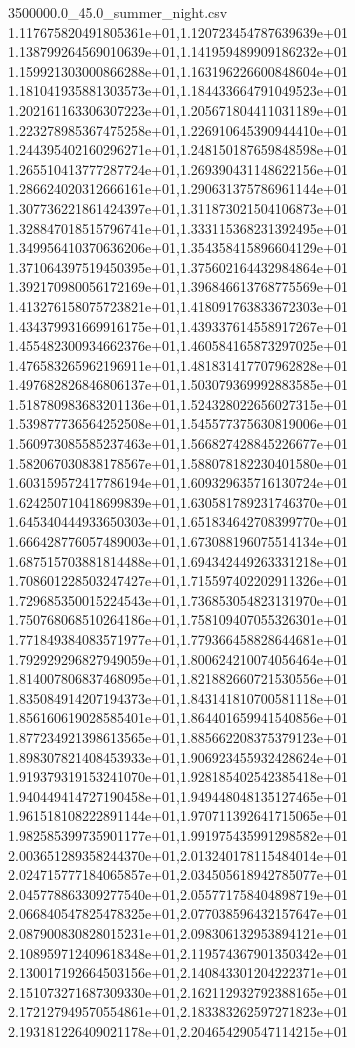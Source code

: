 \begin{filecontents*}{3500000.0_45.0_summer_night.csv}
1.117675820491805361e+01,1.120723454787639639e+01
1.138799264569010639e+01,1.141959489909186232e+01
1.159921303000866288e+01,1.163196226600848604e+01
1.181041935881303573e+01,1.184433664791049523e+01
1.202161163306307223e+01,1.205671804411031189e+01
1.223278985367475258e+01,1.226910645390944410e+01
1.244395402160296271e+01,1.248150187659848598e+01
1.265510413777287724e+01,1.269390431148622156e+01
1.286624020312666161e+01,1.290631375786961144e+01
1.307736221861424397e+01,1.311873021504106873e+01
1.328847018515796741e+01,1.333115368231392495e+01
1.349956410370636206e+01,1.354358415896604129e+01
1.371064397519450395e+01,1.375602164432984864e+01
1.392170980056172169e+01,1.396846613768775569e+01
1.413276158075723821e+01,1.418091763833672303e+01
1.434379931669916175e+01,1.439337614558917267e+01
1.455482300934662376e+01,1.460584165873297025e+01
1.476583265962196911e+01,1.481831417707962828e+01
1.497682826846806137e+01,1.503079369992883585e+01
1.518780983683201136e+01,1.524328022656027315e+01
1.539877736564252508e+01,1.545577375630819006e+01
1.560973085585237463e+01,1.566827428845226677e+01
1.582067030838178567e+01,1.588078182230401580e+01
1.603159572417786194e+01,1.609329635716130724e+01
1.624250710418699839e+01,1.630581789231746370e+01
1.645340444933650303e+01,1.651834642708399770e+01
1.666428776057489003e+01,1.673088196075514134e+01
1.687515703881814488e+01,1.694342449263331218e+01
1.708601228503247427e+01,1.715597402202911326e+01
1.729685350015224543e+01,1.736853054823131970e+01
1.750768068510264186e+01,1.758109407055326301e+01
1.771849384083571977e+01,1.779366458828644681e+01
1.792929296827949059e+01,1.800624210074056464e+01
1.814007806837468095e+01,1.821882660721530556e+01
1.835084914207194373e+01,1.843141810700581118e+01
1.856160619028585401e+01,1.864401659941540856e+01
1.877234921398613565e+01,1.885662208375379123e+01
1.898307821408453933e+01,1.906923455932428624e+01
1.919379319153241070e+01,1.928185402542385418e+01
1.940449414727190458e+01,1.949448048135127465e+01
1.961518108222891144e+01,1.970711392641715065e+01
1.982585399735901177e+01,1.991975435991298582e+01
2.003651289358244370e+01,2.013240178115484014e+01
2.024715777184065857e+01,2.034505618942785077e+01
2.045778863309277540e+01,2.055771758404898719e+01
2.066840547825478325e+01,2.077038596432157647e+01
2.087900830828015231e+01,2.098306132953894121e+01
2.108959712409618348e+01,2.119574367901350342e+01
2.130017192664503156e+01,2.140843301204222371e+01
2.151073271687309330e+01,2.162112932792388165e+01
2.172127949570554861e+01,2.183383262597271823e+01
2.193181226409021178e+01,2.204654290547114215e+01

\end{filecontents*}
